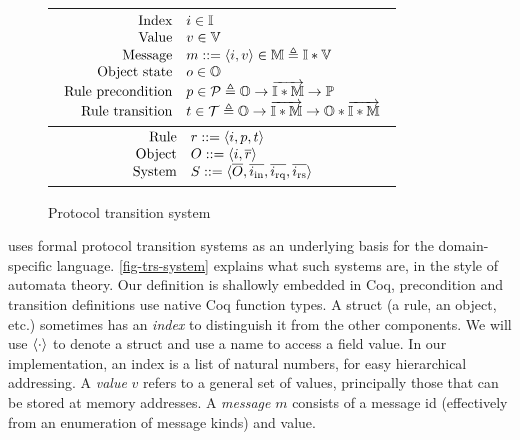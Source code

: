 \documentclass[sigplan,10pt,review,anonymous,screen]{acmart}\settopmatter{printfolios=true,printccs=false,printacmref=false}
\begin{document}
\begin{figure}[t]
  \centering\small
  \begin{tabular}{|c|}
    \hline
    \begin{math}
      \begin{array}{rl}
        \textrm{Index} & i \in \mathbb{I}{} \\
        \textrm{Value} & v \in \mathbb{V}{} \\
        \textrm{Message} & m ::= \langle i, v \rangle \in \mathbb{M}{} \triangleq \mathbb{I} \ast \mathbb{V} \\
        \textrm{Object state} & o \in \mathbb{O}{} \\
        \textrm{Rule precondition} & p \in
        \mathcal{P} \triangleq \mathbb{O} \to \overrightarrow{\mathbb{I} \ast \mathbb{M}} \to \mathbb{P} \\
        \textrm{Rule transition} & t \in
        \mathcal{T} \triangleq \mathbb{O} \to \overrightarrow{\mathbb{I} \ast \mathbb{M}} \to \mathbb{O} \ast \overrightarrow{\mathbb{I} \ast \mathbb{M}} \\
      \end{array}
    \end{math}\\
    \hline
    \begin{math}
      \begin{array}{rl}
        \textrm{Rule} & r ::= \langle i, p, t \rangle \\
        \textrm{Object} & O ::= \langle i, \overline{r} \rangle \\
        \textrm{System} & S ::= \langle \overline{O}, \overline{i_{\textrm{in}}}, \overline{i_{\textrm{rq}}}, \overline{i_{\textrm{rs}}} \rangle \\
      \end{array}
    \end{math}\\
    \hline
  \end{tabular}
  \caption{Protocol transition system}
  \label{fig-trs-system}
\end{figure}

\hemiola{} uses formal protocol transition systems as an underlying basis for the domain-specific language.
\autoref{fig-trs-system} explains what such systems are, in the style of automata theory.
Our definition is shallowly embedded in Coq, \eg{} precondition and transition definitions use native Coq function types.
A struct (a rule, an object, etc.)  sometimes has an \emph{index} to distinguish it from the other components.
We will use $\langle \cdot \rangle$ to denote a struct and use a name to access a field value.
In our implementation, an index is a list of natural numbers, for easy hierarchical addressing.
A \emph{value} $v$ refers to a general set of values, principally those that can be stored at memory addresses.
A \emph{message} $m$ consists of a message id (effectively from an enumeration of message kinds) and value.
\end{document}
